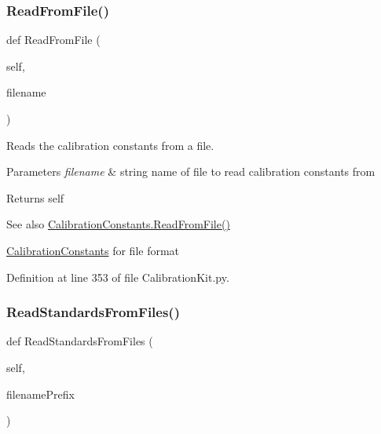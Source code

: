 \subsubsection{\texorpdfstring{Read\+From\+File()}{ReadFromFile()}}
{\footnotesize\ttfamily def Read\+From\+File (\begin{DoxyParamCaption}\item[{}]{self,  }\item[{}]{filename }\end{DoxyParamCaption})}



Reads the calibration constants from a file. 


\begin{DoxyParams}{Parameters}
{\em filename} & string name of file to read calibration constants from \\
\hline
\end{DoxyParams}
\begin{DoxyReturn}{Returns}
self 
\end{DoxyReturn}
\begin{DoxySeeAlso}{See also}
\hyperlink{classSignalIntegrity_1_1Measurement_1_1CalKit_1_1CalibrationKit_1_1CalibrationConstants_a3dc78f8134b7196685f6b0b5ace5e33b}{Calibration\+Constants.\+Read\+From\+File()} 

\hyperlink{classSignalIntegrity_1_1Measurement_1_1CalKit_1_1CalibrationKit_1_1CalibrationConstants}{Calibration\+Constants} for file format 
\end{DoxySeeAlso}


Definition at line 353 of file Calibration\+Kit.\+py.

\mbox{\label{classSignalIntegrity_1_1Measurement_1_1CalKit_1_1CalibrationKit_1_1CalibrationKit_a749305349102d6e6bfd1babeb152046f}} 
\subsubsection{\texorpdfstring{Read\+Standards\+From\+Files()}{ReadStandardsFromFiles()}}
{\footnotesize\ttfamily def Read\+Standards\+From\+Files (\begin{DoxyParamCaption}\item[{}]{self,  }\item[{}]{filename\+Prefix }\end{DoxyParamCaption})}



